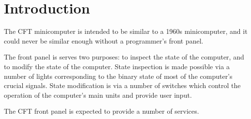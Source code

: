 









\section{Introduction}

The CFT minicomputer is intended to be similar to a 1960s
minicomputer, and it could never be similar enough without a
programmer's front panel.

The front panel is serves two purposes: to inspect the state of the
computer, and to modify the state of the computer. State inspection is
made possible via a number of lights corresponding to the binary state
of most of the computer's crucial signals. State modification is via a
number of switches which control the operation of the computer's main
units and provide user input.

The CFT front panel is expected to provide a number of services.

